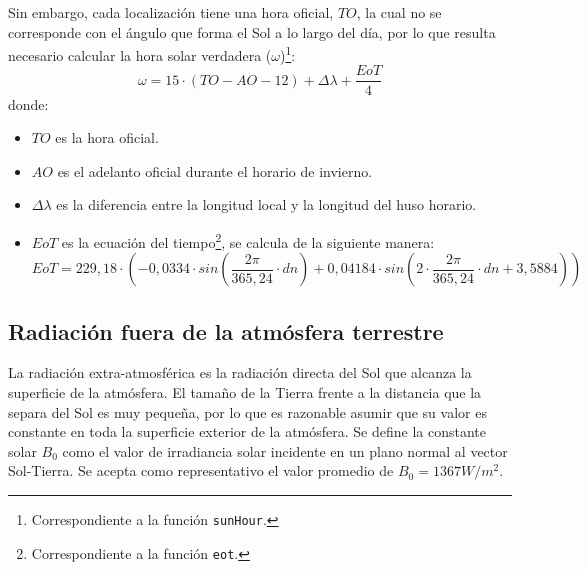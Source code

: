Sin embargo, cada localización tiene una hora oficial, \(TO\), la cual no se corresponde con el ángulo que forma el Sol a lo largo del día, por lo que resulta necesario calcular la hora solar verdadera (\(\omega\))\footnote{Correspondiente a la función \texttt{sunHour}.}:  
\begin{equation}
\omega = 15 \cdot (TO-AO-12)+\Delta \lambda + \frac{EoT}{4}
\end{equation}
donde:
\begin{itemize}
\item \(TO\) es la hora oficial.
\item \(AO\) es el adelanto oficial durante el horario de invierno. 
\item \(\Delta \lambda\) es la diferencia entre la longitud local y la longitud del huso horario. 
\item \(EoT\) es la ecuación del tiempo\footnote{Correspondiente a la función \texttt{eot}.}, se calcula de la siguiente manera: 
\begin{equation}
EoT=229,18\cdot (-0,0334\cdot sin(\frac{2\pi}{365,24}\cdot dn)+0,04184\cdot sin(2\cdot \frac{2\pi}{365,24}\cdot dn+3,5884))
\end{equation}
\end{itemize}

\subsection{Radiación fuera de la atmósfera terrestre}
\label{sec:org5eed147}
La radiación extra-atmosférica es la radiación directa del Sol que alcanza la superficie de la atmósfera. El tamaño de la Tierra frente a la distancia que la separa del Sol es muy pequeña, por lo que es razonable asumir que su valor es constante en toda la superficie exterior de la atmósfera. Se define la constante solar \(B_0\) como el valor de irradiancia solar incidente en un plano normal al vector Sol-Tierra. Se acepta como representativo el valor promedio de \(B_0=1367W/m^2\).

